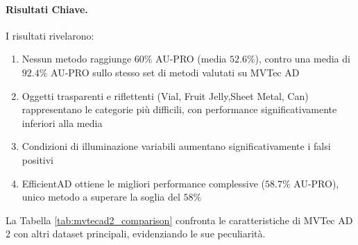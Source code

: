 \paragraph{Risultati Chiave.} I risultati rivelarono:
\begin{enumerate}
\item Nessun metodo raggiunge $60\%$ AU-PRO (media $52.6\%$), contro una media di $92.4\%$ AU-PRO sullo stesso set di metodi valutati su MVTec AD
\item Oggetti trasparenti e riflettenti (Vial, Fruit Jelly,Sheet Metal, Can) rappresentano le categorie più difficili, 
con performance significativamente inferiori alla media
\item Condizioni di illuminazione variabili aumentano significativamente i falsi positivi
\item EfficientAD ottiene le migliori performance complessive 
($58.7\%$ AU-PRO), unico metodo a superare la soglia del $58\%$
\end{enumerate}

La Tabella \ref{tab:mvtecad2_comparison} confronta le caratteristiche di MVTec AD 2 con altri dataset principali, evidenziando le sue peculiarità.

